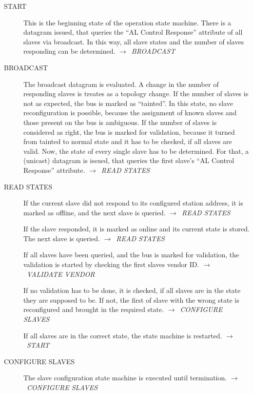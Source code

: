\documentclass[a4paper,12pt,BCOR6mm,bibtotoc,idxtotoc]{scrbook}
\begin{document}
\begin{description}
\item[START] This is the beginning state of the operation state
  machine. There is a datagram issued, that queries the ``AL Control
  Response'' attribute \cite[section~5.3.2]{alspec} of all slaves via
  broadcast. In this way, all slave states and the number of slaves
  responding can be determined.  $\rightarrow$~\textit{BROADCAST}

\item[BROADCAST] The broadcast datagram is evaluated. A change in the
  number of responding slaves is treates as a topology change. If the
  number of slaves is not as expected, the bus is marked as
  ``tainted''. In this state, no slave reconfiguration is possible,
  because the assignment of known slaves and those present on the bus
  is ambiguous. If the number of slaves is considered as right, the
  bus is marked for validation, because it turned from tainted to
  normal state and it has to be checked, if all slaves are valid. Now,
  the state of every single slave has to be determined. For that, a
  (unicast) datagram is issued, that queries the first slave's ``AL
  Control Response'' attribute. $\rightarrow$~\textit{READ STATES}

\item[READ STATES] If the current slave did not respond to its
  configured station address, it is marked as offline, and the next
  slave is queried. $\rightarrow$~\textit{READ STATES}

  If the slave responded, it is marked as online and its current state
  is stored. The next slave is queried. $\rightarrow$~\textit{READ
    STATES}

  If all slaves have been queried, and the bus is marked for
  validation, the validation is started by checking the first slaves
  vendor ID. $\rightarrow$~\textit{VALIDATE VENDOR}

  If no validation has to be done, it is checked, if all slaves are in
  the state they are supposed to be. If not, the first of slave with
  the wrong state is reconfigured and brought in the required state.
  $\rightarrow$~\textit{CONFIGURE SLAVES}

  If all slaves are in the correct state, the state machine is
  restarted. $\rightarrow$~\textit{START}

\item[CONFIGURE SLAVES] The slave configuration state machine is
  executed until termination. $\rightarrow$~\textit{CONFIGURE SLAVES}


\end{description}
\end{document}
